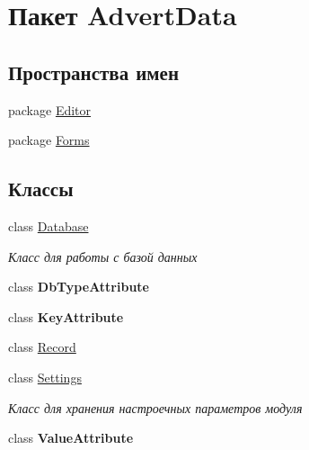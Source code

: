 \hypertarget{namespace_advert_data}{\section{Пакет Advert\+Data}
\label{namespace_advert_data}
}
\subsection*{Пространства имен}
\begin{DoxyCompactItemize}
\item 
package \hyperlink{namespace_advert_data_1_1_editor}{Editor}
\item 
package \hyperlink{namespace_advert_data_1_1_forms}{Forms}
\end{DoxyCompactItemize}
\subsection*{Классы}
\begin{DoxyCompactItemize}
\item 
class \hyperlink{class_advert_data_1_1_database}{Database}
\begin{DoxyCompactList}\small\item\em Класс для работы с базой данных \end{DoxyCompactList}\item 
class {\bfseries Db\+Type\+Attribute}
\item 
class {\bfseries Key\+Attribute}
\item 
class \hyperlink{class_advert_data_1_1_record}{Record}
\item 
class \hyperlink{class_advert_data_1_1_settings}{Settings}
\begin{DoxyCompactList}\small\item\em Класс для хранения настроечных параметров модуля \end{DoxyCompactList}\item 
class {\bfseries Value\+Attribute}
\end{DoxyCompactItemize}
